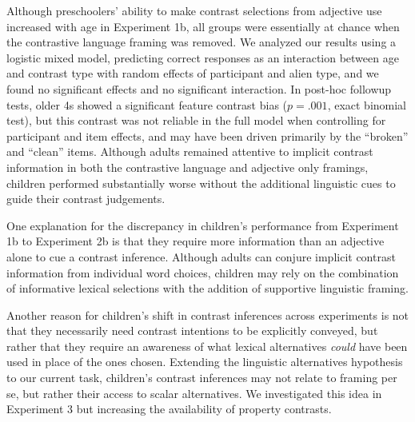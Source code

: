 \documentclass[10pt,letterpaper]{article}
\begin{document}
Although preschoolers' ability to make contrast selections from adjective use increased with age in Experiment 1b, all groups were essentially at chance when the contrastive language framing was removed.  We analyzed our results using a logistic mixed model, predicting correct responses as an interaction between age and contrast type with random effects of participant and alien type, and we found no significant effects and no significant interaction. In post-hoc followup tests, older 4s showed a significant feature contrast bias ($p  = .001$, exact binomial test), but this contrast was not reliable in the full model when controlling for participant and item effects, and may have been driven primarily by the ``broken'' and ``clean'' items. Although adults remained attentive to implicit contrast information in both the contrastive language and adjective only framings, children performed substantially worse without the additional linguistic cues to guide their contrast judgements.  






One explanation for the discrepancy in children's performance from Experiment 1b to Experiment 2b is that they require more information than an adjective alone to cue a contrast inference.  Although adults can conjure implicit contrast information from individual word choices, children may rely on the combination of informative lexical selections with the addition of supportive linguistic framing.  

Another reason for children's shift in contrast inferences across experiments is not that they necessarily need contrast intentions to be explicitly conveyed, but rather that they require an awareness of what lexical alternatives \emph{could} have been used in place of the ones chosen.  Extending the linguistic alternatives hypothesis to our current task, children's contrast inferences may not relate to framing per se, but rather their access to scalar alternatives.  We investigated this idea in Experiment 3 but increasing the availability of property contrasts. 
\end{document}

